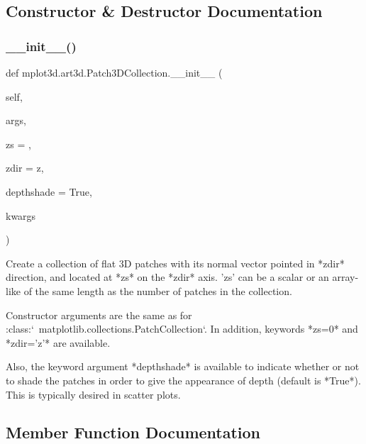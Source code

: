\subsection{Constructor \& Destructor Documentation}
\mbox{\label{classmplot3d_1_1art3d_1_1Patch3DCollection_a920a0bd33bae0010e96dfc2a7ab5d6ef}} 
\subsubsection{\texorpdfstring{\+\_\+\+\_\+init\+\_\+\+\_\+()}{\_\_init\_\_()}}
{\footnotesize\ttfamily def mplot3d.\+art3d.\+Patch3\+D\+Collection.\+\_\+\+\_\+init\+\_\+\+\_\+ (\begin{DoxyParamCaption}\item[{}]{self,  }\item[{}]{args,  }\item[{}]{zs = {},  }\item[{}]{zdir = {\ttfamily \textquotesingle{}z\textquotesingle{}},  }\item[{}]{depthshade = {\ttfamily True},  }\item[{}]{kwargs }\end{DoxyParamCaption})}

\begin{DoxyVerb}Create a collection of flat 3D patches with its normal vector
pointed in *zdir* direction, and located at *zs* on the *zdir*
axis. 'zs' can be a scalar or an array-like of the same length as
the number of patches in the collection.

Constructor arguments are the same as for
:class:`~matplotlib.collections.PatchCollection`. In addition,
keywords *zs=0* and *zdir='z'* are available.

Also, the keyword argument *depthshade* is available to
indicate whether or not to shade the patches in order to
give the appearance of depth (default is *True*).
This is typically desired in scatter plots.
\end{DoxyVerb}
 

\subsection{Member Function Documentation}
\mbox{\label{classmplot3d_1_1art3d_1_1Patch3DCollection_a9adaf4437b78c23ca0d431817afd3594}} 
